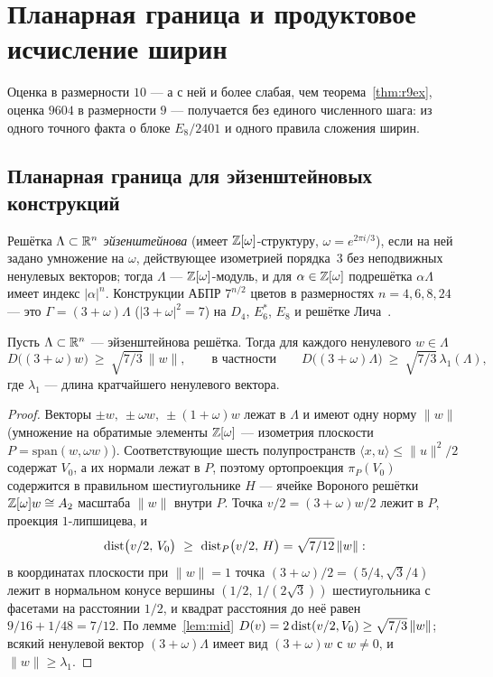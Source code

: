 \section{Планарная граница и продуктовое исчисление ширин}
\label{sec:product}

Оценка в размерности $10$ --- а с ней и более слабая, чем
теорема~\ref{thm:r9ex}, оценка $9604$ в размерности $9$ --- получается без
единого численного шага: из одного точного факта о блоке $E_8/2401$ и одного
правила сложения ширин.

\subsection{Планарная граница для эйзенштейновых конструкций}

Решётка $\Lambda\subset\mathbb{R}^n$ \emph{эйзенштейнова} (имеет
$\mathbb{Z}[\omega]$-структуру, $\omega=e^{2\pi i/3}$), если на ней задано умножение
на $\omega$, действующее изометрией порядка~$3$ без неподвижных ненулевых
векторов; тогда $\Lambda$ --- $\mathbb{Z}[\omega]$-модуль, и для
$\alpha\in\mathbb{Z}[\omega]$ подрешётка $\alpha\Lambda$ имеет индекс $|\alpha|^n$.
Конструкции АБПР $7^{n/2}$ цветов в размерностях $n=4,6,8,24$ --- это
$\Gamma=(3+\omega)\Lambda$ ($|3+\omega|^2=7$) на $D_4$, $E_6^*$, $E_8$ и
решётке Лича~\cite{ABPR}.

\begin{proposition}\label{prop:planar}
Пусть $\Lambda\subset\mathbb{R}^n$ --- эйзенштейнова решётка. Тогда для каждого
ненулевого $w\in\Lambda$
\[
D\bigl((3+\omega)w\bigr)\ \ge\ \sqrt{7/3}\,\|w\|,
\qquad\text{в частности}\qquad
D\bigl((3+\omega)\Lambda\bigr)\ \ge\ \sqrt{7/3}\,\lambda_1(\Lambda),
\]
где $\lambda_1$ --- длина кратчайшего ненулевого вектора.
\end{proposition}

\begin{proof}
Векторы $\pm w,\ \pm\omega w,\ \pm(1+\omega)w$ лежат в $\Lambda$ и имеют одну
норму $\|w\|$ (умножение на обратимые элементы $\mathbb{Z}[\omega]$ --- изометрия
плоскости $P=\mathrm{span}(w,\omega w)$). Соответствующие шесть полупространств
$\langle x,u\rangle\le\|u\|^2/2$ содержат $V_0$, а их нормали лежат в $P$,
поэтому ортопроекция $\pi_P(V_0)$ содержится в правильном шестиугольнике $H$ ---
ячейке Вороного решётки $\mathbb{Z}[\omega]w\cong A_2$ масштаба $\|w\|$ внутри $P$.
Точка $v/2=(3+\omega)w/2$ лежит в $P$, проекция $1$-липшицева, и
\[
\dist\bigl(v/2,\,V_0\bigr)\ \ge\ \dist_P\bigl(v/2,\,H\bigr)
=\sqrt{7/12}\,\|w\|:
\]
в координатах плоскости при $\|w\|=1$ точка $(3+\omega)/2=(5/4,\sqrt3/4)$
лежит в нормальном конусе вершины $(1/2,\,1/(2\sqrt3))$ шестиугольника с
фасетами на расстоянии $1/2$, и квадрат расстояния до неё равен
$9/16+1/48=7/12$. По лемме~\ref{lem:mid}
$D(v)=2\operatorname{dist}(v/2,V_0)\ge\sqrt{7/3}\,\|w\|$; всякий ненулевой вектор
$(3+\omega)\Lambda$ имеет вид $(3+\omega)w$ с $w\ne0$, и $\|w\|\ge\lambda_1$.
\end{proof}

